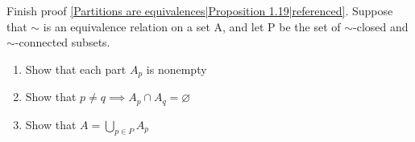

Finish proof \ref{Partitions are equivalences|Proposition 1.19|referenced}. Suppose that $\sim$ is an equivalence relation on a set A, and let P be the set of $\sim$-closed and $\sim$-connected subsets.
\begin{enumerate}
  \item Show that each part $A_p$ is nonempty
  \item Show that $p \ne q \implies A_p \cap A_q = \varnothing$
  \item Show that $A = \bigcup_{p \in P} A_p$
\end{enumerate}